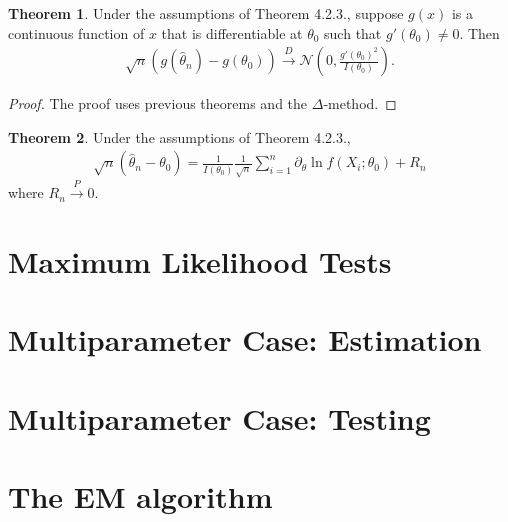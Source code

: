 \documentclass{book}
\theoremstyle{definition}
\newtheorem{thm}{Theorem}[section]
\newcommand{\p}{\partial}
\newcommand{\N}{\mathcal{N}}
\newcommand{\f}[2]{\frac{#1}{#2}}
\newcommand{\lp}{\left(}
\newcommand{\rp}{\right)}
\begin{document}
\begin{thm}
	Under the assumptions of Theorem 4.2.3., suppose $g(x)$ is a continuous function of $x$ that is differentiable at $\theta_0$ such that $g'(\theta_0) \neq 0$. Then 
	\begin{align}
	\sqrt{n}(g(\hat\theta_n) - g(\theta_0)) \xrightarrow{D} \N\lp 0, \f{g'(\theta_0)^2}{I(\theta_0)} \rp.
	\end{align}
\end{thm}

\begin{proof}
	The proof uses previous theorems and the $\Delta$-method. 
\end{proof}



\begin{thm}
	Under the assumptions of Theorem 4.2.3., 
	\begin{align}
	\sqrt{n}(\hat\theta_n - \theta_0) = \f{1}{I(\theta_0)}\f{1}{\sqrt{n}}\sum^n_{i=1}\p_\theta \ln f(X_i; \theta_0) + R_n
	\end{align}
	where $R_n \xrightarrow{P} 0$. 
\end{thm}














\section{Maximum Likelihood Tests}
\section{Multiparameter Case: Estimation}
\section{Multiparameter Case: Testing}
\section{The EM algorithm}
\end{document}
